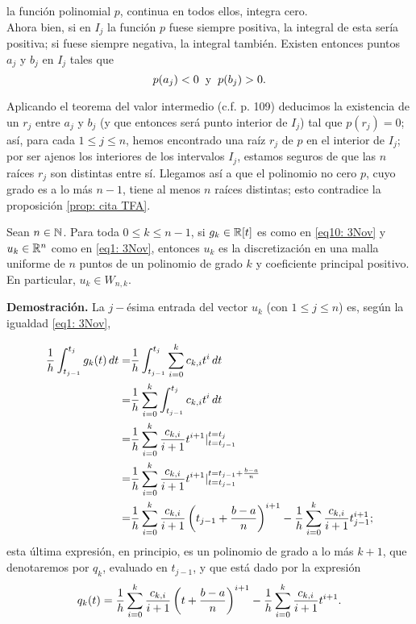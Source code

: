 \noindent la función polinomial $p$, continua en todos ellos, 
integra cero. \\

Ahora bien, si en $I_{j}$ la función $p$ fuese siempre
positiva, la integral de esta sería positiva; si fuese
siempre negativa, la integral también. Existen entonces
puntos $a_{j}$ y $ b_{j}$ en $I_{j}$ tales que
\[
p(a_{j})<0 \hspace{0.2cm} \text{y}
\hspace{0.2cm} p(b_{j})>0.
\]

\noindent Aplicando el teorema del valor intermedio
(c.f. \cite{spivak} p. 109)  
deducimos la existencia de un 
$r_{j}$ entre $a_{j}$ y 
$b_{j}$ (y que entonces será punto
interior de $I_{j}$) tal que $p(r_{j})=0$;
así, para cada $1 \leq j \leq n$,
hemos
encontrado una raíz $r_{j}$ de $p$ en 
el interior de $I_{j}$;
por ser ajenos los interiores de los intervalos $I_{j}$,
estamos seguros de que las $n$ raíces $r_{j}$ son distintas
entre sí.
Llegamos así
a que el polinomio no cero $p$, cuyo grado es a lo más $n-1$,
tiene al menos $n$ raíces distintas; esto
contradice la proposición \ref{prop: cita TFA}.
\QEDB
\vspace{0.2cm}

\begin{prop}
\label{prop: uk son discretizaciones pol...}
Sean $n \in \mathbb{N}$. Para toda $0 \leq k\leq n-1$, si
$g_{k} \in \mathbb{R}[t]$ es como en \eqref{eq10: 3Nov}
y $u_{k} \in \mathbb{R}^{n}$ como en
\eqref{eq1: 3Nov}, entonces
$u_{k}$ es la discretización en una malla uniforme
de $n$ puntos de un polinomio de grado $k$
y coeficiente principal positivo. En particular,
$u_{k} \in W_{n,k}$.
\end{prop}
\noindent
\textbf{Demostración.}
La $j-$ésima entrada del vector $u_{k}$
(con $1 \leq j \leq n$)
es, según la igualdad \eqref{eq1: 3Nov},

\begin{align} 
\frac{1}{h} \int_{t_{j-1}}^{t_{j}}{g_{k}(t)} \,dt = &
\frac{1}{h} \int_{t_{j-1}}^{t_{j}}{\suma{i=0}{k}{c_{k,i}t^{i}}} \,dt 
\nonumber \\
= & \frac{1}{h} \suma{i=0}{k}{\int_{t_{j-1}}^{t_{j}}{c_{k,i}t^{i}} \, dt}
\nonumber \\
= & \frac{1}{h} \suma{i=0}{k}{
\frac{c_{k,i}}{i+1}t^{i+1} | ^{t=t_{j}}_{t=t_{j-1}}
} 
\nonumber \\
= & \frac{1}{h} \suma{i=0}{k}{
\frac{c_{k,i}}{i+1}t^{i+1} | ^{t=t_{j-1}+\frac{b-a}{n}}_{t=t_{j-1}}} 
\nonumber \\
= & 
\frac{1}{h} \suma{i=0}{k}{
\frac{c_{k,i}}{i+1} \left( t_{j-1}+ \frac{b-a}{n} \right)^{i+1}}-
\frac{1}{h} \suma{i=0}{k}{
\frac{c_{k,i}}{i+1} t_{j-1}^{i+1}}; \nonumber\\
\end{align}
esta última expresión, en principio, es un polinomio
de grado a lo más $k+1$,
que denotaremos por $q_{k}$, evaluado en $t_{j-1}$,
y que está dado por la expresión
\begin{equation} \label{eq2: 5Nov}
q_{k}(t)= \frac{1}{h} \sum\limits_{i=0}^{k}
\frac{c_{k,i}}{i+1} \left(t+ \frac{b-a}{n} \right)^{i+1}-
\frac{1}{h} \sum\limits_{i=0}^{k}
\frac{c_{k,i}}{i+1} t^{i+1}.
\end{equation}

